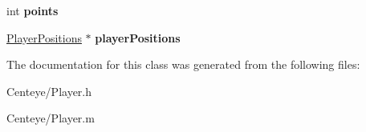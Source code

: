 \begin{DoxyCompactItemize}
\item 
\hypertarget{interface_player_adf0398ea8c1f29175204508ab642b64e}{int {\bfseries points}}\label{interface_player_adf0398ea8c1f29175204508ab642b64e}

\item 
\hypertarget{interface_player_ab531bfc9b7b57ca22fdb1ea45d5e8697}{\hyperlink{interface_player_positions}{Player\+Positions} $\ast$ {\bfseries player\+Positions}}\label{interface_player_ab531bfc9b7b57ca22fdb1ea45d5e8697}

\end{DoxyCompactItemize}


The documentation for this class was generated from the following files\+:\begin{DoxyCompactItemize}
\item 
Centeye/Player.\+h\item 
Centeye/Player.\+m\end{DoxyCompactItemize}
